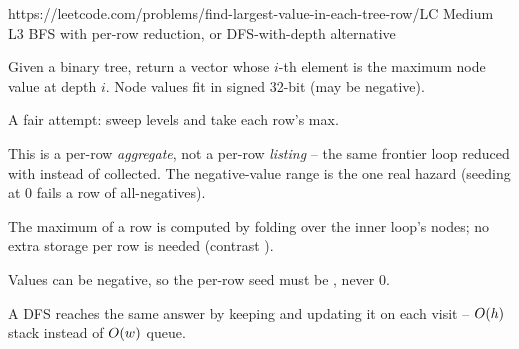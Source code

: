  {https://leetcode.com/problems/find-largest-value-in-each-tree-row/}{LC Medium L3}
  {BFS with per-row reduction, or DFS-with-depth alternative}

\begin{problemstatement}
Given a binary tree, return a vector whose $i$-th element is the maximum node value at
depth $i$. Node values fit in signed 32-bit (may be negative).
\end{problemstatement}

\begin{attemptgate}
A fair attempt: sweep levels and take each row's max.
\end{attemptgate}

This is a per-row \emph{aggregate}, not a per-row \emph{listing} -- the same frontier loop
reduced with  instead of collected. The negative-value range is the one real
hazard (seeding  at $0$ fails a row of all-negatives).

\begin{observation}
The maximum of a row is computed by folding  over the inner loop's nodes; no
extra storage per row is needed (contrast ).
\end{observation}
\begin{observation}
Values can be negative, so the per-row seed must be , never $0$.
\end{observation}
\begin{observation}
A DFS reaches the same answer by keeping  and updating it on each visit --
$O(h)$ stack instead of $O(w)$ queue.
\end{observation}

\begin{thinkbox}
\end{thinkbox}

